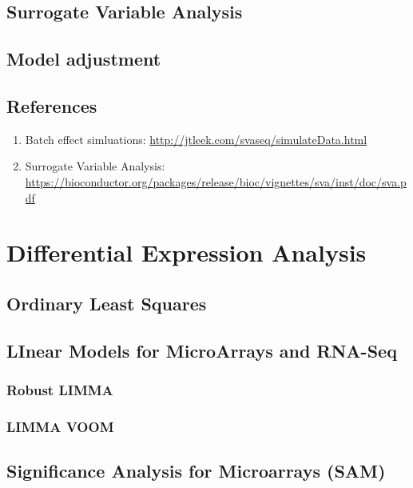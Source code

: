 \documentclass[]{book}
\providecommand{\tightlist}{%
  \setlength{\itemsep}{0pt}\setlength{\parskip}{0pt}}
\begin{document}
\section{Surrogate Variable Analysis}\label{surrogate-variable-analysis}

\section{Model adjustment}\label{model-adjustment}

\section{References}\label{references-1}

\begin{enumerate}
\def\labelenumi{\arabic{enumi}.}
\tightlist
\item
  Batch effect simluations:
  \url{http://jtleek.com/svaseq/simulateData.html}
\item
  Surrogate Variable Analysis:
  \url{https://bioconductor.org/packages/release/bioc/vignettes/sva/inst/doc/sva.pdf}
\end{enumerate}

\chapter{Differential Expression Analysis}\label{diff-exp}

\section{Ordinary Least Squares}\label{ordinary-least-squares}

\section{LInear Models for MicroArrays and
RNA-Seq}\label{linear-models-for-microarrays-and-rna-seq}

\subsection{Robust LIMMA}\label{robust-limma}

\subsection{LIMMA VOOM}\label{limma-voom}

\section{Significance Analysis for Microarrays
(SAM)}\label{significance-analysis-for-microarrays-sam}
\end{document}
